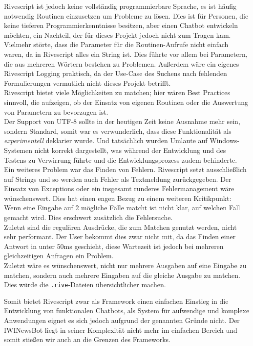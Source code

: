 Rivescript ist jedoch keine vollständig programmierbare Sprache, es ist häufig notwendig Routinen einzusetzen um Probleme zu lösen. Dies ist für Personen, die keine tieferen Programmierkenntnisse besitzen, aber einen Chatbot entwickeln möchten, ein Nachteil, der für dieses Projekt jedoch nicht zum Tragen kam. Vielmehr störte, dass die Parameter für die Routinen-Aufrufe nicht einfach waren, da in Rivescript alles ein String ist. Dies führte vor allem bei Parametern, die aus mehreren Wörtern bestehen zu Problemen. Außerdem wäre ein eigenes Rivescript Logging praktisch, da der Use-Case des Suchens nach fehlenden Formulierungen vermutlich nicht dieses Projekt betrifft. \\
Rivescript bietet viele Möglichkeiten zu matchen; hier wären Best Practices sinnvoll, die aufzeigen, ob der Einsatz von eigenen Routinen oder die Auswertung von Parametern zu bevorzugen ist.\\
Der Support von UTF-8 sollte in der heutigen Zeit keine Ausnahme mehr sein, sondern Standard, somit war es verwunderlich, dass diese Funktionalität als \textit{experimentell} deklarier wurde. Und tatsächlich wurden Umlaute auf Windows-Systemen nicht korrekt dargestellt, was während der Entwicklung und des Testens zu Verwirrung führte und die Entwicklungsprozess zudem behinderte.\\
Ein weiteres Problem war das Finden von Fehlern. Rivescript setzt ausschließlich auf Strings und so werden auch Fehler als Textmeldung zurückgegeben. Der Einsatz von Exceptions oder ein insgesamt runderes Fehlermanagement wäre wünschenswert. Dies hat einen engen Bezug zu einem weiteren Kritikpunkt: Wenn eine Eingabe auf 2 mögliche Fälle matcht ist nicht klar, auf welchen Fall gemacht wird. Dies erschwert zusätzlich die Fehlersuche.\\
Zuletzt sind die regulären Ausdrücke, die zum Matchen genutzt werden, nicht sehr performant. Der User bekommt dies zwar nicht mit, da das Finden einer Antwort in unter 50ms geschieht, diese Wartezeit ist jedoch bei mehreren gleichzeitigen Anfragen ein Problem.\\
Zuletzt wäre es wünschenswert, nicht nur mehrere Ausgaben auf eine Eingabe zu matchen, sondern auch mehrere Eingaben auf die gleiche Ausgabe zu matchen. Dies würde die \texttt{.rive}-Dateien übersichtlicher machen.

Somit bietet Rivescript zwar als Framework einen einfachen Einstieg in die Entwicklung von funktionalen Chatbots, als System für aufwendige und komplexe Anwendungen eignet es sich jedoch aufgrund der genannten Gründe nicht. Der IWINewsBot liegt in seiner Komplexität nicht mehr im einfachen Bereich und somit stießen wir auch an die Grenzen des Frameworks.

